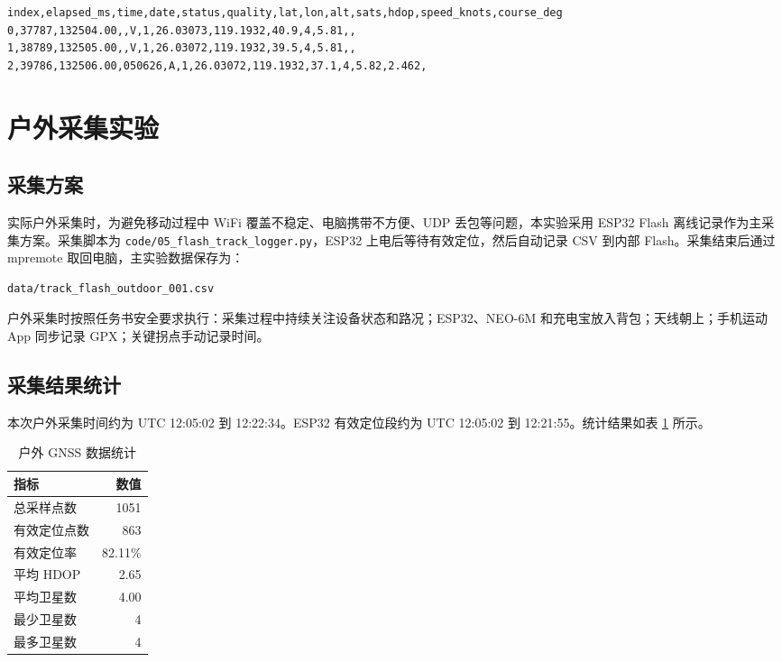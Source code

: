 \documentclass[UTF8,a4paper,12pt]{ctexart}
\begin{document}
\begin{lstlisting}
index,elapsed_ms,time,date,status,quality,lat,lon,alt,sats,hdop,speed_knots,course_deg
0,37787,132504.00,,V,1,26.03073,119.1932,40.9,4,5.81,,
1,38789,132505.00,,V,1,26.03072,119.1932,39.5,4,5.81,,
2,39786,132506.00,050626,A,1,26.03072,119.1932,37.1,4,5.82,2.462,
\end{lstlisting}

\section{户外采集实验}
\subsection{采集方案}
实际户外采集时，为避免移动过程中 WiFi 覆盖不稳定、电脑携带不方便、UDP 丢包等问题，本实验采用 ESP32 Flash 离线记录作为主采集方案。采集脚本为 \verb|code/05_flash_track_logger.py|，ESP32 上电后等待有效定位，然后自动记录 CSV 到内部 Flash。采集结束后通过 mpremote 取回电脑，主实验数据保存为：

\begin{lstlisting}
data/track_flash_outdoor_001.csv
\end{lstlisting}

户外采集时按照任务书安全要求执行：采集过程中持续关注设备状态和路况；ESP32、NEO-6M 和充电宝放入背包；天线朝上；手机运动 App 同步记录 GPX；关键拐点手动记录时间。

\subsection{采集结果统计}
本次户外采集时间约为 UTC 12:05:02 到 12:22:34。ESP32 有效定位段约为 UTC 12:05:02 到 12:21:55。统计结果如表 \ref{tab:outdoor-summary} 所示。

\begin{table}[H]
\centering
\caption{户外 GNSS 数据统计}
\label{tab:outdoor-summary}
\begin{tabular}{lr}
\toprule
指标 & 数值 \\
\midrule
总采样点数 & 1051 \\
有效定位点数 & 863 \\
有效定位率 & 82.11\% \\
平均 HDOP & 2.65 \\
平均卫星数 & 4.00 \\
最少卫星数 & 4 \\
最多卫星数 & 4 \\
\bottomrule
\end{tabular}
\end{table}
\end{document}
